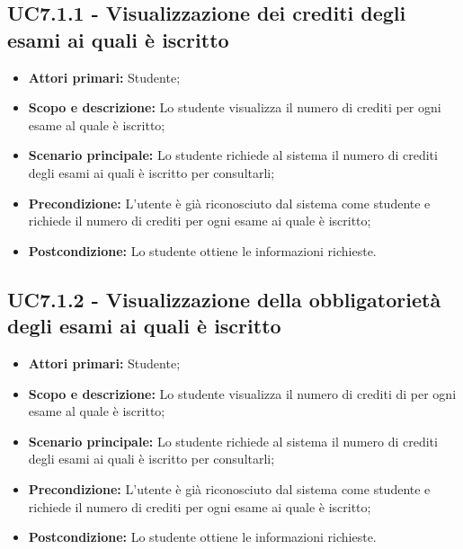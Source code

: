 \documentclass[AnalisiDeiRequisiti.tex]{subfiles}
\begin{document}
\subsection{UC7.1.1 - Visualizzazione dei crediti degli esami ai quali è iscritto}
\begin{itemize}
\item \textbf{Attori primari:} Studente;\\
\item \textbf{Scopo e descrizione:} Lo studente visualizza il numero di crediti per ogni esame al quale è iscritto;\\
\item \textbf{Scenario principale:} Lo studente richiede al sistema il numero di crediti degli esami ai quali è iscritto per consultarli;\\
\item \textbf{Precondizione:} L'utente è già riconosciuto dal sistema come studente e richiede il numero di crediti per ogni esame ai quale è iscritto;\\
\item \textbf{Postcondizione:} Lo studente ottiene le informazioni richieste.\\
\end{itemize}

\subsection{UC7.1.2 - Visualizzazione della obbligatorietà degli esami ai quali è iscritto}
\begin{itemize}
	\item \textbf{Attori primari:} Studente;\\
	\item \textbf{Scopo e descrizione:} Lo studente visualizza il numero di crediti di per ogni esame al quale è iscritto;\\
	\item \textbf{Scenario principale:} Lo studente richiede al sistema il numero di crediti degli esami ai quali è iscritto per consultarli;\\
	\item \textbf{Precondizione:} L'utente è già riconosciuto dal sistema come studente e richiede il numero di crediti per ogni esame ai quale è iscritto;\\
	\item \textbf{Postcondizione:} Lo studente ottiene le informazioni richieste.\\
\end{itemize}
\end{document}
